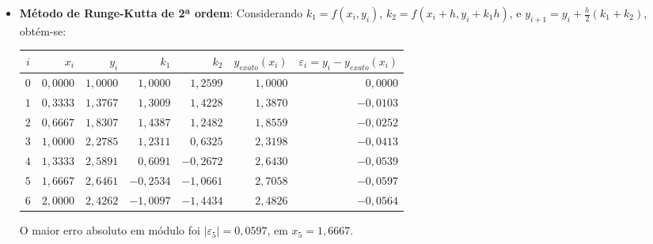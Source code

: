 \documentclass[12pt,a4paper]{article}
\begin{document}
\begin{enumerate}
\begin{enumerate}
\begin{itemize}
\item \textbf{Método de Runge-Kutta de 2ª ordem}:  Considerando
$k_1 = f(x_i, y_i)$,
$k_2 = f(x_i + h, y_i + k_1 h)$, e
$y_{i+1} = y_i + \frac{h}{2} (k_1 + k_2)$, obtém-se:
\medskip
\begin{center}
    \begin{tabular}{crrrrrr}
    \hline
      $i$ & $x_i$  & $y_i$ & $k_1$ & $k_2$ & $y_{exato}(x_i)$
      & $\varepsilon_i = y_i-y_{exato}(x_i)$ \\ \hline
    $0$ & $0,0000$ & $1,0000$ & $ 1,0000$ & $ 1,2599$ & $1,0000$ & $ 0,0000$ \\
    $1$ & $0,3333$ & $1,3767$ & $ 1,3009$ & $ 1,4228$ & $1,3870$ & $-0,0103$ \\
    $2$ & $0,6667$ & $1,8307$ & $ 1,4387$ & $ 1,2482$ & $1,8559$ & $-0,0252$ \\
    $3$ & $1,0000$ & $2,2785$ & $ 1,2311$ & $ 0,6325$ & $2,3198$ & $-0,0413$ \\
    $4$ & $1,3333$ & $2,5891$ & $ 0,6091$ & $-0,2672$ & $2,6430$ & $-0,0539$ \\
    $5$ & $1,6667$ & $2,6461$ & $-0,2534$ & $-1,0661$ & $2,7058$ & $-0,0597$ \\
    $6$ & $2,0000$ & $2,4262$ & $-1,0097$ & $-1,4434$ & $2,4826$ & $-0,0564$ \\
    \hline
    \end{tabular}
\end{center}
\medskip
O maior erro absoluto em módulo foi $|\varepsilon_5| = 0,0597$, em $x_5 = 1,6667$.


\end{itemize}
\end{enumerate}
\end{enumerate}
\end{document}
